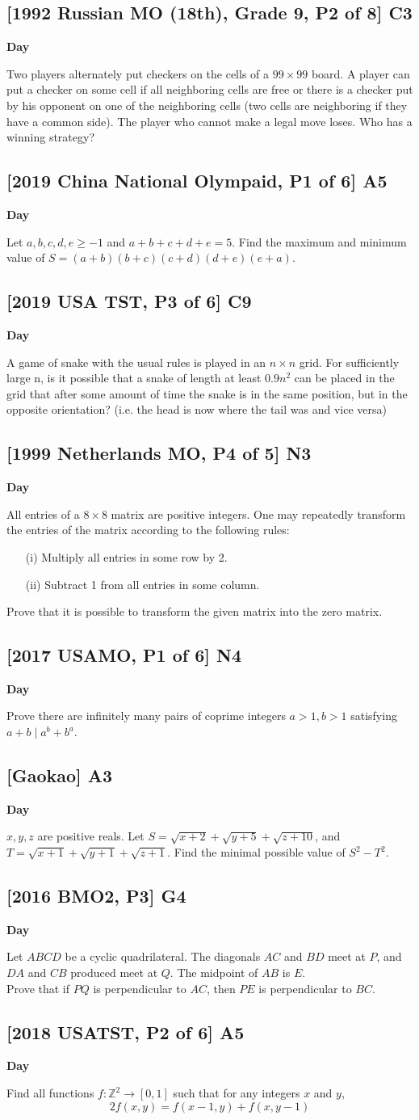 \documentclass[10pt]{article}
\newcommand{\themonth}{March}
\newcommand{\theyear}{2019}
\newcounter{day}
\newcounter{solution}
\newcounter{datenumber}
\newcommand{\problem}[4][0]{
	\newpage
	\subsection{[#3] \space #2} \hfill 
	{\large\textbf{Day \arabic{day}}} %
	\begin{flushleft} #4 \end{flushleft}
	\vspace{1em}
	\addtocounter{day}{1}
	\addtocounter{datenumber}{1}
	\setcounter{solution}{1}
}
\begin{document}
\problem[118]{C3}{1992 Russian MO (18th), Grade 9, P2 of 8}{Two players alternately put checkers on the cells of a $99 \times 99$ board. A player can put a checker on some cell if all neighboring cells are free or there is a checker put by his opponent on one of the neighboring cells (two cells are neighboring if they have a common side). The player who cannot make a legal move loses. Who has a winning strategy?}

\problem[119]{A5}{2019 China National Olympaid, P1 of 6}{Let \(a,b,c,d,e \geq -1\) and \(a+b+c+d+e=5.\) Find the maximum and minimum value of \(S=(a+b)(b+c)(c+d)(d+e)(e+a).\)}

\problem[120]{C9}{2019 USA TST, P3 of 6}{A game of snake with the usual rules is played in an $n \times n$ grid. For sufficiently large n, is it possible that a snake of length at least $0.9n^2$ can be placed in the grid that after some amount of time the snake is in the same position, but in the opposite orientation? (i.e. the head is now where the tail was and vice versa)}

\problem[121]{N3}{1999 Netherlands MO, P4 of 5}{All entries of a \(8 \times 8\) matrix are positive integers. One may repeatedly transform the entries of the matrix according to the following rules:
	\begin{enumerate}
		\item[(i)] Multiply all entries in some row by 2.
		\item[(ii)] Subtract 1 from all entries in some column.
	\end{enumerate}
Prove that it is possible to transform the given matrix into the zero matrix.}

\problem[122]{N4}{2017 USAMO, P1 of 6}{Prove there are infinitely many pairs of coprime integers $a>1, b>1$ satisfying $a+b \mid a^b + b^a.$}

\problem[123]{A3}{Gaokao}{$x, y, z$ are positive reals. Let $S = \sqrt{x+2} + \sqrt{y+5} + \sqrt{z+10}$, and $T = \sqrt{x+1} + \sqrt{y+1} + \sqrt{z+1}$. Find the minimal possible value of $S^2 - T^2$.}

\problem[124]{G4}{2016 BMO2, P3}{Let \(ABCD\) be a cyclic quadrilateral. The diagonals \(AC\) and \(BD\) meet at \(P\), and \(DA\) and \(CB\) produced meet at \(Q\). The midpoint of \(AB\) is \(E\).\\
Prove that if \(PQ\) is perpendicular to \(AC\), then \(PE\) is perpendicular to \(BC\).}

\problem[125]{A5}{2018 USATST, P2 of 6}{Find all functions $f: \mathbb{Z}^2 \to [0, 1]$ such that for any integers $x$ and $y$, $$2f(x, y) = f(x - 1, y) + f(x, y - 1)$$}
\end{document}
